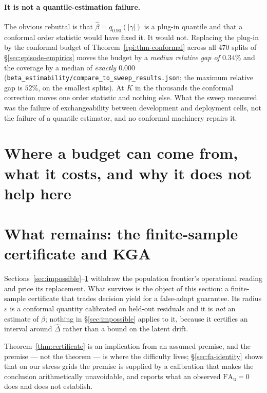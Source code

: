 \paragraph{It is not a quantile-estimation failure.} The obvious rebuttal is that
$\widehat\beta=q_{0.90}(|\gamma|)$ is a plug-in quantile and that a conformal order statistic would
have fixed it. It would not. Replacing the plug-in by the conformal budget of
Theorem~\ref{epi:thm-conformal} across all $470$ splits of \S\ref{sec:episode-empirics} moves the
budget by a \emph{median relative gap of $0.34\%$} and the coverage by a median of \emph{exactly
$0.000$} (\texttt{beta\_estimability/compare\_to\_sweep\_results.json}; the maximum relative gap is
$52\%$, on the smallest splits). At $K$ in the thousands the conformal correction moves one order
statistic and nothing else. What the sweep measured was the failure of exchangeability between
development and deployment cells, not the failure of a quantile estimator, and no conformal
machinery repairs it.



\section{Where a budget can come from, what it costs, and why it does not help
here}\label{sec:episode}


\section{What remains: the finite-sample certificate and KGA}\label{sec:method}
Sections~\ref{sec:impossible}--\ref{sec:episode} withdraw the population frontier's operational
reading and price its replacement. What survives is the object of this section: a finite-sample
certificate that trades decision yield for a false-adapt guarantee. Its radius $\varepsilon$ is a
conformal quantity calibrated on held-out residuals and it is \emph{not} an estimate of $\beta$;
nothing in \S\ref{sec:impossible} applies to it, because it certifies an interval around
$\widehat\Delta$ rather than a bound on the latent drift.





\noindent Theorem~\ref{thm:certificate} is an implication from an assumed premise, and the premise
--- not the theorem --- is where the difficulty lives; \S\ref{sec:fa-identity} shows that on our
stress grids the premise is supplied by a calibration that makes the conclusion arithmetically
unavoidable, and reports what an observed $\mathrm{FA}_{\mathrm u}=0$ does and does not establish.


